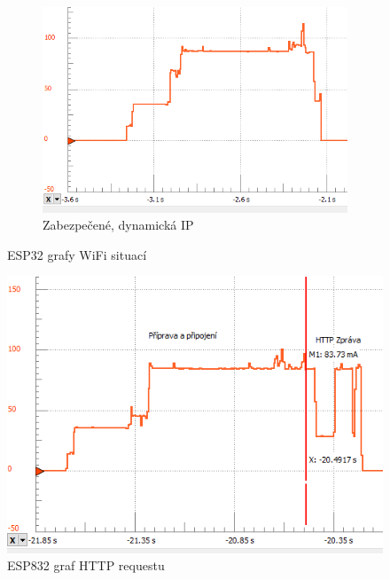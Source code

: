 \documentclass[a4paper, 12pt]{report}
\begin{document}
\begin{figure}[h!]
\begin{subfigure}[b]{0.4\linewidth}
            \includegraphics[width=\linewidth]{images/ESP32_network_static_security}
            \caption{Zabezpečené, dynamická IP}
        \end{subfigure}
        \caption{ESP32 grafy WiFi situací}
        \label{fig:esp32_network}
    \end{figure}
    \begin{figure}[h!]
        \centering
        \includegraphics[width=12cm]{images/ESP32_http}
        \caption{ESP832 graf HTTP requestu}
        \label{fig:esp32_http}
    \end{figure}
\end{document}
